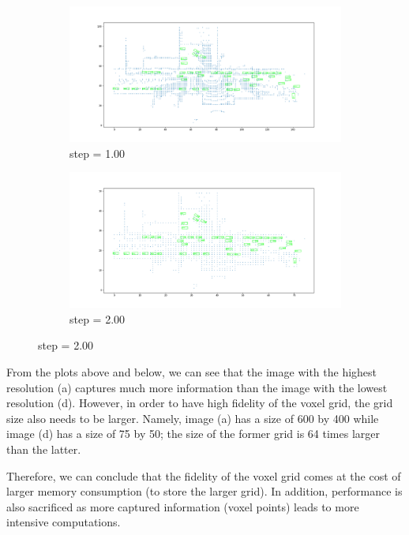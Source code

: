 \documentclass[letter]{article}
\begin{document}
	\begin{figure}[h]
		\begin{subfigure}[t]{\textwidth}
			\centering
			\includegraphics[width=\linewidth]{images/vox000_step1-00.png}
			\vspace*{-10mm}
			\caption{step = 1.00}
		\end{subfigure}
	  
		\begin{subfigure}[t]{\textwidth}
			\centering
			\includegraphics[width=\linewidth]{images/vox000_step2-00.png}
			\vspace*{-10mm}
			\caption{step = 2.00}
		\end{subfigure}
	\end{figure}

	From the plots above and below, we can see that the image with the highest resolution (a) captures much more information than the image with the lowest resolution (d). However, in order to have high fidelity of the voxel grid, the grid size also needs to be larger. Namely, image (a) has a size of 600 by 400 while image (d) has a size of 75 by 50; the size of the former grid is 64 times larger than the latter. 

	Therefore, we can conclude that the fidelity of the voxel grid comes at the cost of larger memory consumption (to store the larger grid). In addition, performance is also sacrificed as more captured information (voxel points) leads to more intensive computations. 
\end{document}
